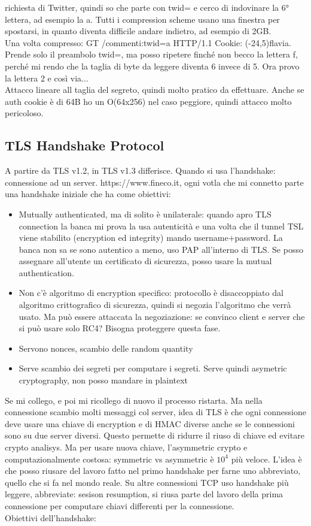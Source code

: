 \documentclass[16px]{article}
\begin{document}
richiesta di Twitter, quindi so che parte con twid= e cerco di indovinare la 6° lettera, ad esempio la a. Tutti  i compression scheme usano una finestra per spostarsi, in quanto diventa difficile andare indietro, ad esempio di 2GB.\\ Una volta compresso: GT /commenti:twid=a HTTP/1.1 Cookie: (-24,5)flavia. Prende solo il preambolo twid=, ma posso ripetere finché non becco la lettera f, perché mi rendo che la taglia di byte da leggere diventa 6 invece di 5. Ora provo la lettera 2 e così via...\\ Attacco lineare all taglia del segreto, quindi molto pratico da effettuare. Anche se auth cookie è di 64B ho un O(64x256) nel caso peggiore, quindi attacco molto pericoloso.
\subsection{TLS Handshake Protocol}
A partire da TLS v1.2, in TLS v1.3 differisce.
Quando si usa l'handshake:\\
connessione ad un server. https://www.fineco.it, ogni votla che mi connetto parte una handshake iniziale che ha come obiettivi:
\begin{itemize}
\item Mutually authenticated, ma di solito è unilaterale: quando apro TLS connection la banca mi prova la usa autenticità e una volta che il tunnel TSL viene stabilito (encryption ed integrity) mando username+password. La banca non sa se sono autentico a meno, uso PAP all'interno di TLS. Se posso assegnare all'utente un certificato di sicurezza, posso usare la mutual authentication.
\item Non c'è algoritmo di encryption specifico: protocollo è disaccoppiato dal algoritmo crittografico di sicurezza, quindi si negozia l'algoritmo che verrà usato. Ma può essere attaccata la negoziazione: se convinco client e server che si può usare solo RC4? Bisogna proteggere questa fase.
\item Servono nonces, scambio delle random quantity
\item Serve scambio dei segreti per computare i segreti. Serve quindi asymetric cryptography,  non posso mandare in plaintext
\end{itemize}
Se mi collego, e poi mi ricollego di nuovo il processo ristarta. Ma nella connessione scambio molti messaggi col server, idea di TLS è che ogni connessione deve usare una chiave di encryption e di HMAC diverse anche se le connessioni sono su due server diversi. Questo permette di ridurre il riuso di chiave ed evitare crypto analisys. Ma per usare nuova chiave, l'asymmetric crypto e computazionalmente costosa: symmetric vs asymmetric è $10^4$ più veloce. L'idea è che posso riusare del lavoro fatto nel primo handshake per farne uno abbreviato, quello che si fa nel mondo reale. Su altre connessioni TCP uso handshake più leggere, abbreviate: sesison resumption, si riusa parte del lavoro della prima connessione per computare chiavi differenti per la connessione.\\Obiettivi dell'handshake:
\end{document}
